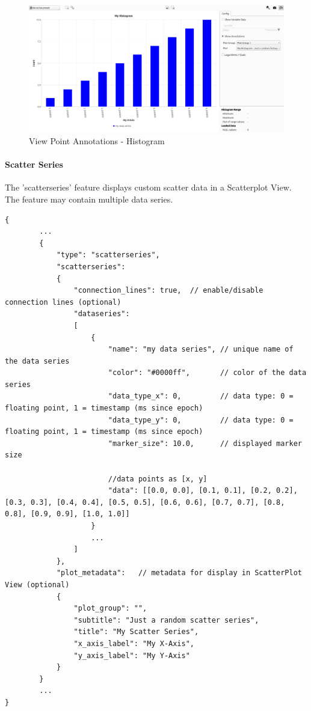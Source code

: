 \begin{figure}[H]
    \center
        \includegraphics[width=15cm]{figures/viewpoints_anno_example_histogram.png}
    \caption{View Point Annotations - Histogram} 
\end{figure}

\paragraph{Scatter Series} The 'scatterseries' feature displays custom scatter data in a Scatterplot View. 
The feature may contain multiple data series.

\begin{lstlisting}[basicstyle=\small\ttfamily]
{
        ...
        {
            "type": "scatterseries",
            "scatterseries": 
            {
                "connection_lines": true,  // enable/disable connection lines (optional)
                "dataseries": 
                [
                    {
                        "name": "my data series", // unique name of the data series
                        "color": "#0000ff",       // color of the data series
                        "data_type_x": 0,         // data type: 0 = floating point, 1 = timestamp (ms since epoch)
                        "data_type_y": 0,         // data type: 0 = floating point, 1 = timestamp (ms since epoch)
                        "marker_size": 10.0,      // displayed marker size

                        //data points as [x, y]
                        "data": [[0.0, 0.0], [0.1, 0.1], [0.2, 0.2], [0.3, 0.3], [0.4, 0.4], [0.5, 0.5], [0.6, 0.6], [0.7, 0.7], [0.8, 0.8], [0.9, 0.9], [1.0, 1.0]]
                    }
                    ...
                ]
            },
            "plot_metadata":   // metadata for display in ScatterPlot View (optional)
            {
                "plot_group": "",
                "subtitle": "Just a random scatter series",
                "title": "My Scatter Series",
                "x_axis_label": "My X-Axis",
                "y_axis_label": "My Y-Axis"
            }
        }
        ...
}
\end{lstlisting}

